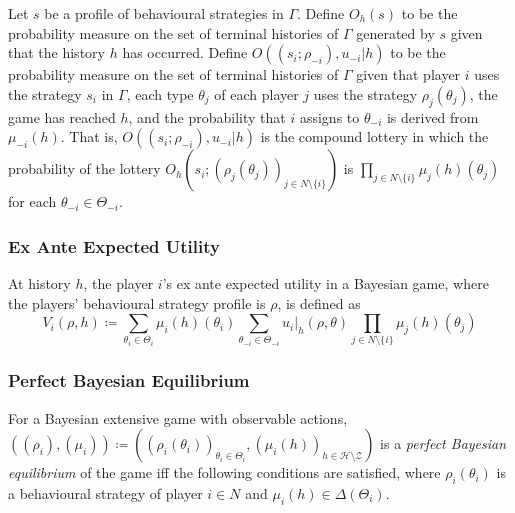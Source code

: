 \documentclass[UTF8,11pt,colorlinks,compress,openany]{beamer}%
\begin{document}
\begin{frame}\frametitle{}
Let $s$ be a profile of behavioural strategies in $\Gamma$. Define $O_h(s)$ to be the probability measure on the set of terminal histories of $\Gamma$ generated by $s$ given that the history $h$ has occurred. Define $O((s_i;\rho_{-i}),u_{-i}|h)$ to be the probability measure on the set of terminal histories of $\Gamma$ given that player $i$ uses the strategy $s_i$ in $\Gamma$, each type $\theta_j$ of each player $j$ uses the strategy $\rho_j(\theta_j)$, the game has reached $h$, and
the probability that $i$ assigns to $\theta_{-i}$ is derived from $\mu_{-i}(h)$. That is, $O((s_i;\rho_{-i}),u_{-i}|h)$ is the compound lottery in which the probability of the lottery $O_h(s_i;(\rho_j(\theta_j))_{j\in N\setminus\{i\}})$ is $\prod\limits_{j\in N\setminus\{i\}}\mu_j(h)(\theta_j)$ for each $\theta_{-i}\in\Theta_{-i}$.
\end{frame}

\begin{frame}\frametitle{Ex Ante Expected Utility}
\begin{definition}
	At history $h$, the player $i$'s ex ante expected utility in a Bayesian game, where the players' behavioural strategy profile is $\rho$, is defined as
	\[V_i(\rho,h)\coloneqq \sum\limits_{\theta_i\in\Theta_i}\mu_i(h)(\theta_i)\sum\limits_{\theta_{-i}\in\Theta_{-i}}u_i|_h(\rho,\theta)\prod\limits_{j\in N\setminus\{i\}}\mu_j(h)(\theta_j)\]
\end{definition}
\end{frame}

\begin{frame}\frametitle{Perfect Bayesian Equilibrium}
\begin{definition}
	For a Bayesian extensive game with observable actions, $((\rho_i),(\mu_i))\coloneqq ((\rho_i(\theta_i))_{\theta_i\in\Theta_i},(\mu_i(h))_{h\in\mathcal{H}\setminus\mathcal{Z}})$ is a \emph{perfect Bayesian equilibrium} of the game iff the following conditions are satisfied, where $\rho_i(\theta_i)$ is a behavioural strategy of player $i\in N$ and $\mu_i(h)\in\Delta(\Theta_i)$.
\end{definition}
\end{frame}
\end{document}
